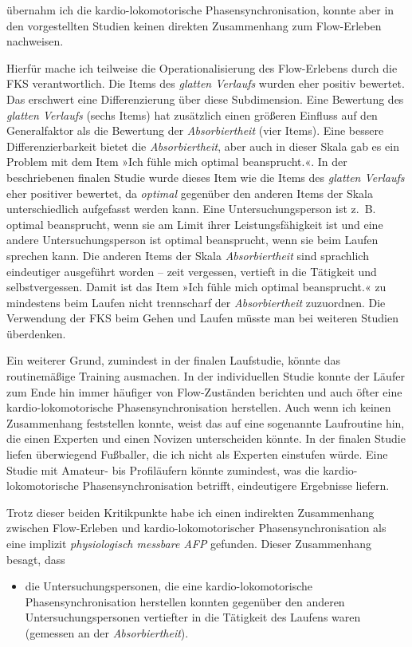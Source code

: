 übernahm ich die kardio-lokomotorische Phasensynchronisation, konnte aber in den vorgestellten Studien keinen direkten Zusammenhang zum Flow-Erleben nachweisen.

Hierfür mache ich teilweise die Operationalisierung des Flow-Erlebens durch die \ac{FKS} verantwortlich. Die Items des \emph{glatten Verlaufs} wurden eher positiv bewertet. Das erschwert eine Differenzierung über diese Subdimension. Eine Bewertung des \emph{glatten Verlaufs} (sechs Items) hat zusätzlich einen größeren Einfluss auf den Generalfaktor als die Bewertung der \emph{Absorbiertheit} (vier Items). Eine bessere Differenzierbarkeit bietet die \emph{Absorbiertheit}, aber auch in dieser Skala gab es ein Problem mit dem Item »Ich fühle mich optimal beansprucht.«. In der beschriebenen finalen Studie wurde dieses Item wie die Items des \emph{glatten Verlaufs} eher positiver bewertet, da \emph{optimal} gegenüber den anderen Items der Skala unterschiedlich aufgefasst werden kann. Eine Untersuchungsperson ist z.~B. optimal beansprucht, wenn sie am Limit ihrer Leistungsfähigkeit ist und eine andere Untersuchungsperson ist optimal beansprucht, wenn sie beim Laufen sprechen kann. Die anderen Items der Skala \emph{Absorbiertheit} sind sprachlich eindeutiger ausgeführt worden -- zeit vergessen, vertieft in die Tätigkeit und selbstvergessen. Damit ist das Item »Ich fühle mich optimal beansprucht.« zu mindestens beim Laufen nicht trennscharf der \emph{Absorbiertheit} zuzuordnen. Die Verwendung der \ac{FKS} beim Gehen und Laufen müsste man bei weiteren Studien überdenken.

Ein weiterer Grund, zumindest in der finalen Laufstudie, könnte das routinemäßige Training ausmachen. In der individuellen Studie konnte der Läufer zum Ende hin immer häufiger von Flow-Zuständen berichten und auch öfter eine kardio-lokomotorische Phasensynchronisation herstellen. Auch wenn ich keinen Zusammenhang feststellen konnte, weist das auf eine sogenannte Laufroutine hin, die einen Experten und einen Novizen unterscheiden könnte. In der finalen Studie liefen überwiegend Fußballer, die ich nicht als Experten einstufen würde. Eine Studie mit Amateur- bis Profiläufern könnte zumindest, was die kardio-lokomotorische Phasensynchronisation betrifft, eindeutigere Ergebnisse liefern.

Trotz dieser beiden Kritikpunkte habe ich einen indirekten Zusammenhang zwischen Flow-Erleben und kardio-lokomotorischer Phasensynchronisation als eine implizit \emph{physiologisch messbare \ac{AFP}} gefunden. Dieser Zusammenhang besagt, dass 
\begin{itemize}
	
	\item die Untersuchungspersonen, die eine kardio-lokomotorische Phasensynchronisation herstellen konnten gegenüber den anderen Untersuchungspersonen vertiefter in die Tätigkeit des Laufens waren (gemessen an der \emph{Absorbiertheit}).
\end{itemize}

